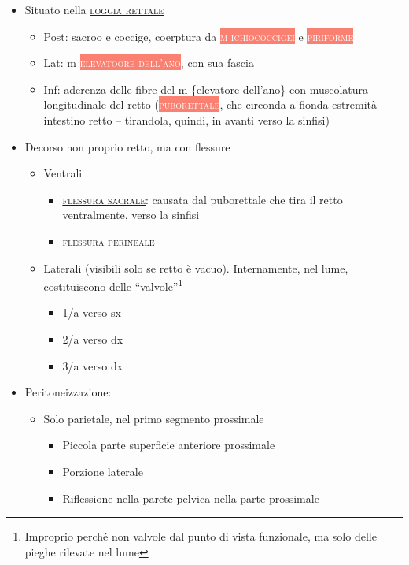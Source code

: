 \documentclass[italian,]{article}
\providecommand{\tightlist}{%
  \setlength{\itemsep}{0pt}\setlength{\parskip}{0pt}}
\newcommand{\mus}[1]{\colorbox{Salmon}{\textcolor{white}{\textsc{#1}}}}
\renewcommand{\a}[1]{\underline{\textsc{#1}}}
\begin{document}
\begin{itemize}
\tightlist
\item
  Situato nella \a{loggia rettale}

  \begin{itemize}
  \tightlist
  \item
    Post: sacroo e coccige, coerptura da \mus{m ichiococcigei} e
    \mus{piriforme}
  \item
    Lat: m \mus{elevatoore dell'ano}, con sua fascia
  \item
    Inf: aderenza delle fibre del m \{elevatore dell'ano\} con
    muscolatura longitudinale del retto (\mus{puborettale}, che circonda
    a fionda estremità intestino retto -- tirandola, quindi, in avanti
    verso la sinfisi)
  \end{itemize}
\item
  Decorso non proprio retto, ma con flessure

  \begin{itemize}
  \tightlist
  \item
    Ventrali

    \begin{itemize}
    \item
      \a{flessura sacrale}: causata dal puborettale che tira il retto
      ventralmente, verso la sinfisi
    \item
      \a{flessura perineale}
    \end{itemize}
  \item
    Laterali (visibili solo se retto è vacuo). Internamente, nel lume,
    costituiscono delle ``valvole''\footnote{Improprio perché non
      valvole dal punto di vista funzionale, ma solo delle pieghe
      rilevate nel lume}

    \begin{itemize}
    \tightlist
    \item
      1/a verso sx
    \item
      2/a verso dx
    \item
      3/a verso dx
    \end{itemize}
  \end{itemize}
\item
  Peritoneizzazione:

  \begin{itemize}
  \tightlist
  \item
    Solo parietale, nel primo segmento prossimale

    \begin{itemize}
    \tightlist
    \item
      Piccola parte superficie anteriore prossimale
    \item
      Porzione laterale
    \item
      Riflessione nella parete pelvica nella parte prossimale


\end{itemize}
\end{itemize}
\end{itemize}
\end{document}
